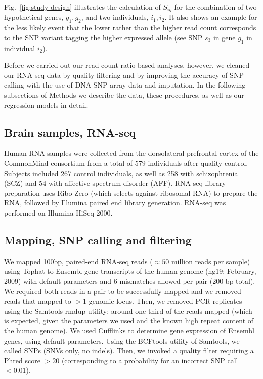\documentclass[letterpaper]{article}
\begin{document}
Fig.~\ref{fig:study-design} illustrates the calculation of \(S_{ig}\) for the
combination of two hypothetical genes, \(g_1,g_2\), and two individuals,
\(i_1,i_2\).  It also shows an example for the less likely event that the lower rather
than the higher read count corresponds to the SNP variant tagging the higher
expressed allele (see SNP \(s_3\) in gene \(g_1\) in individual \(i_2\)).

Before we carried out our read count ratio-based analyses, however, we cleaned
our RNA-seq data by quality-filtering and by improving the accuracy of SNP
calling with the use of DNA SNP array data and imputation. In the following
subsections of Methods we describe the data, these procedures, as well as our
regression models in detail.

\subsection{Brain samples, RNA-seq}

Human RNA samples were collected from the dorsolateral prefrontal cortex of
the CommonMind consortium from a total of \(579\) individuals after
quality control. Subjects included 267 control individuals, as well as 258
with schizophrenia (SCZ) and 54 with affective spectrum disorder (AFF).
RNA-seq library preparation uses Ribo-Zero (which selects against ribosomal
RNA) to prepare the RNA, followed by Illumina paired end library generation.
RNA-seq was performed on Illumina HiSeq 2000.

\subsection{Mapping, SNP calling and filtering}

We mapped 100bp, paired-end RNA-seq reads (\(\approx50\) million reads per sample) using Tophat
to Ensembl gene transcripts of the human genome (hg19; February, 2009) with
default parameters and 6 mismatches allowed per pair (200 bp total). We
required both reads in a pair to be successfully mapped and we removed reads
that mapped to \(>1\) genomic locus. Then, we removed PCR replicates using the
Samtools rmdup utility; around one third of the reads mapped (which is
expected, given the parameters we used and the known high repeat content of
the human genome). We used Cufflinks to determine gene expression of Ensembl
genes, using default parameters. Using the BCFtools utility of Samtools, we
called SNPs (SNVs only, no indels). Then, we invoked a quality filter
requiring a Phred score \(>20\) (corresponding to a probability for an
incorrect SNP call \(<0.01\)).
\end{document}
